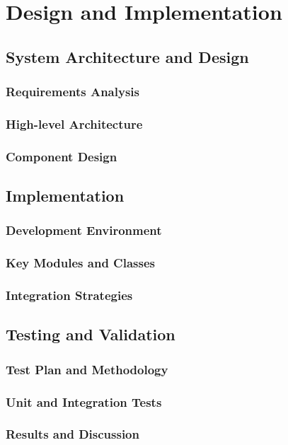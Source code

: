 \documentclass[11pt]{report}
\begin{document}
\part{Design and Implementation}

\chapter{System Architecture and Design}
\section{Requirements Analysis}
\section{High-level Architecture}
\section{Component Design}

\chapter{Implementation}
\section{Development Environment}
\section{Key Modules and Classes}
\section{Integration Strategies}

\chapter{Testing and Validation}
\section{Test Plan and Methodology}
\section{Unit and Integration Tests}
\section{Results and Discussion}
\end{document}
